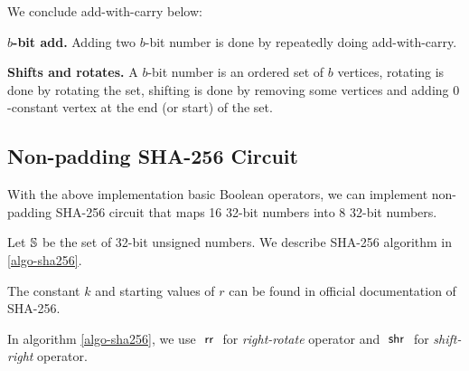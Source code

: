 We conclude add-with-carry below:

\textbf{$b$-bit add.} Adding two $b$-bit number is done by repeatedly doing add-with-carry.

\textbf{Shifts and rotates.} A $b$-bit number is an ordered set of $b$ vertices, rotating is done by rotating the set, shifting is done by removing some vertices and adding $0$-constant vertex at the end (or start) of the set.

\subsection{Non-padding SHA-256 Circuit}

With the above implementation basic Boolean operators, we can implement non-padding SHA-256 circuit that maps 16 32-bit numbers into 8 32-bit numbers.

Let $\S$ be the set of 32-bit unsigned numbers. We describe SHA-256 algorithm in \ref{algo-sha256}.

The constant $k$ and starting values of $r$ can be found in official documentation of SHA-256.

In algorithm \ref{algo-sha256}, we use $\aRR$ for \textit{right-rotate} operator and $\aShr$ for \textit{shift-right} operator.

